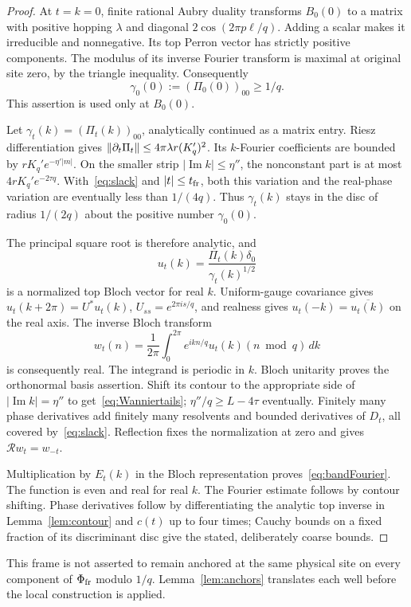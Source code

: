 \begin{proof}
At $t=k=0$, finite rational Aubry duality transforms $B_0(0)$ to a matrix with positive hopping $\lambda$ and diagonal $2\cos(2\pi p\ell/q)$. Adding a scalar makes it irreducible and nonnegative. Its top Perron vector has strictly positive components. The modulus of its inverse Fourier transform is maximal at original site zero, by the triangle inequality. Consequently
\[
 \gamma_0(0):=(\Pi_0(0))_{00}\ge1/q.
\]
This assertion is used only at $B_0(0)$.

Let $\gamma_t(k)=(\Pi_t(k))_{00}$, analytically continued as a matrix entry. Riesz differentiation gives
$\lVert \partial_t\Pi_t\rVert\le4\pi\lambda r(K_q')^2$. Its $k$-Fourier coefficients are bounded by $rK_q'e^{-\eta'|m|}$. On the smaller strip $|\operatorname{Im}k|\le\eta''$, the nonconstant part is at most $4rK_q'e^{-2\tau q}$. With~\eqref{eq:slack} and $|t|\le t_{\rm fr}$, both this variation and the real-phase variation are eventually less than $1/(4q)$. Thus $\gamma_t(k)$ stays in the disc of radius $1/(2q)$ about the positive number $\gamma_0(0)$.

The principal square root is therefore analytic, and
\[
 u_t(k)=\frac{\Pi_t(k)\delta_0}{\gamma_t(k)^{1/2}}
\]
is a normalized top Bloch vector for real $k$. Uniform-gauge covariance gives $u_t(k+2\pi)=U^*u_t(k)$, $U_{ss}=e^{2\pi is/q}$, and realness gives $u_t(-k)=\overline{u_t(k)}$ on the real axis. The inverse Bloch transform
\[
 w_t(n)=\frac1{2\pi}\int_0^{2\pi}
 e^{ikn/q}u_t(k)(n\bmod q)\,dk
\]
is consequently real. The integrand is periodic in $k$. Bloch unitarity proves the orthonormal basis assertion. Shift its contour to the appropriate side of $|\operatorname{Im}k|=\eta''$ to get~\eqref{eq:Wanniertails}; $\eta''/q\ge L-4\tau$ eventually. Finitely many phase derivatives add finitely many resolvents and bounded derivatives of $D_t$, all covered by~\eqref{eq:slack}. Reflection fixes the normalization at zero and gives $\mathcal Rw_t=w_{-t}$.

Multiplication by $E_t(k)$ in the Bloch representation proves~\eqref{eq:bandFourier}. The function is even and real for real $k$. The Fourier estimate follows by contour shifting. Phase derivatives follow by differentiating the analytic top inverse in Lemma~\ref{lem:contour} and $c(t)$ up to four times; Cauchy bounds on a fixed fraction of its discriminant disc give the stated, deliberately coarse bounds.
\end{proof}

This frame is not asserted to remain anchored at the same physical site on every component of $\Phi_{\rm fr}$ modulo $1/q$. Lemma~\ref{lem:anchors} translates each well before the local construction is applied.

